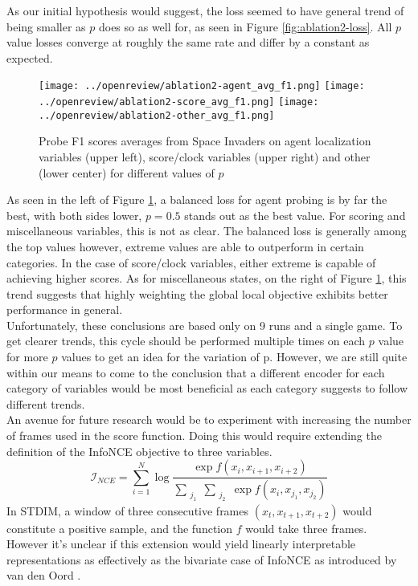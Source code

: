 As our initial hypothesis would suggest, the loss seemed to have general trend of being smaller as $p$ does so as well for, as seen in Figure \ref{fig:ablation2-loss}. All $p$ value losses converge at roughly the same rate and differ by a constant as expected.

\begin{figure}[H]
    \centering
    \texttt{[image: ../openreview/ablation2-agent\_avg\_f1.png]}
    \texttt{[image: ../openreview/ablation2-score\_avg\_f1.png]}
    \texttt{[image: ../openreview/ablation2-other\_avg\_f1.png]}
    \caption{Probe F1 scores averages from Space Invaders on agent localization variables (upper left), score/clock variables (upper right) and other (lower center) for different values of $p$}
    \label{fig:ablation2-avg}
\end{figure}

As seen in the left of Figure \ref{fig:ablation2-avg}, a balanced loss for agent probing is by far the best, with both sides lower, $p=0.5$ stands out as the best value. For scoring and miscellaneous variables, this is not as clear. The balanced loss is generally among the top values however, extreme values are able to outperform in certain categories. In the case of score/clock variables, either extreme is capable of achieving higher scores. As for miscellaneous states, on the right of Figure \ref{fig:ablation2-avg}, this trend suggests that highly weighting the global local objective exhibits better performance in general. \\

Unfortunately, these conclusions are based only on 9 runs and a single game. To get clearer trends, this cycle should be performed multiple times on each $p$ value for more $p$ values to get an idea for the variation of p. However, we are still quite within our means to come to the conclusion that a different encoder for each category of variables would be most beneficial as each category suggests to follow different trends. \\

An avenue for future research would be to experiment with increasing the number of frames used in the score function. Doing this would require extending the definition of the InfoNCE objective to three variables.
\begin{equation}
\mathcal{I}_{NCE}=\sum_{i=1}^N\log{\frac{\exp{f(x_i,x_{i+1},x_{i+2})}}{\sum\limits_{\substack{j_1}}\sum\limits_{\substack{j_2}} \exp{f(x_i,x_{j_{1}},x_{j_{2}})}}}
\end{equation}
In STDIM, a window of three consecutive frames $(x_t, x_{t+1},x_{t+2})$ would constitute a positive sample, and  the function $f$ would take three frames. However it's unclear if this extension would yield linearly interpretable representations as effectively as the bivariate case of InfoNCE as introduced by van den Oord \cite{infoNCE}.

